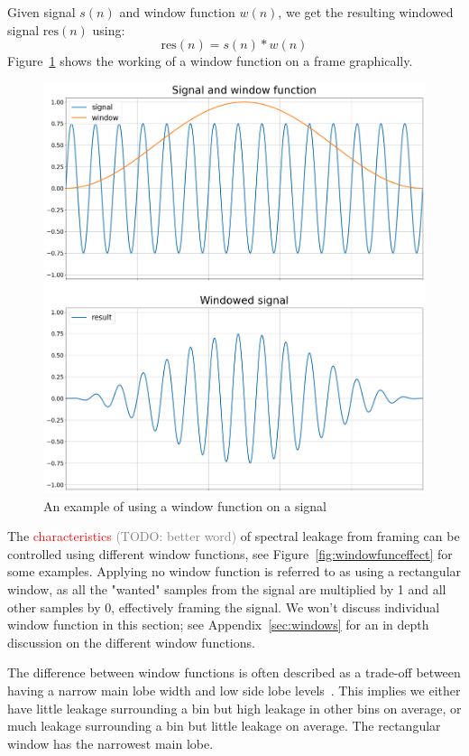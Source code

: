 \documentclass[10pt,twocolumn]{article}
\begin{document}
Given signal $s(n)$ and window function $w(n)$, we get the resulting windowed signal $\text{res}(n)$ using:
\[ \text{res}(n) = s(n) * w(n) \]
Figure~\ref{fig:windowfunc} shows the working of a window function on a frame graphically.
\begin{figure}[H]
    \centering
    \includegraphics[width=\linewidth]{fig/window.png}
    \caption{An example of using a window function on a signal}
    \label{fig:windowfunc}
\end{figure}

The \textcolor{red}{characteristics} \textcolor{gray}{(TODO: better word)} of spectral leakage from framing can be controlled using different window functions, see Figure~\ref{fig:windowfunceffect} for some examples. Applying no window function is referred to as using a rectangular window, as all the "wanted" samples from the signal are multiplied by 1 and all other samples by 0, effectively framing the signal. We won't discuss individual window function in this section; see Appendix~\ref{sec:windows} for an in depth discussion on the different window functions.

The difference between window functions is often described as a trade-off between having a narrow main lobe width and low side lobe levels~\cite{windowfunc}. This implies we either have little leakage surrounding a bin but high leakage in other bins on average, or much leakage surrounding a bin but little leakage on average. The rectangular window has the narrowest main lobe.
\end{document}
